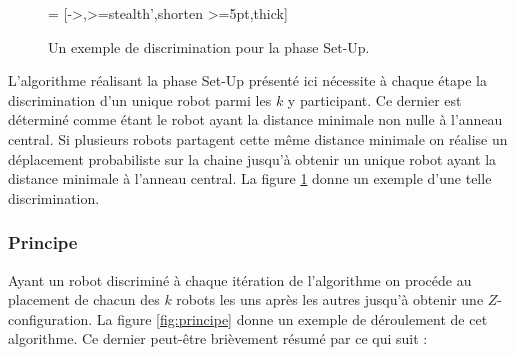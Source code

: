 \documentclass{article}
\begin{document}
        \begin{figure}[h]
          \centering
           = [->,>=stealth',shorten >=5pt,thick]
          \caption{Un exemple de discrimination pour la phase Set-Up.}
          \label{fig:discri}
        \end{figure}

        L'algorithme réalisant la phase Set-Up présenté ici nécessite à chaque
        étape la discrimination d'un unique robot parmi les $k$ y
        participant. Ce dernier est déterminé comme étant le robot ayant la
        distance minimale non nulle à l'anneau central. Si plusieurs robots
        partagent cette même distance minimale on réalise un déplacement
        probabiliste sur la chaine jusqu'à obtenir un unique robot ayant la
        distance minimale à l'anneau central. La figure \ref{fig:discri} donne
        un exemple d'une telle discrimination.

      \subsubsection{Principe}
      
        Ayant un robot discriminé à chaque itération de l'algorithme on procéde
        au placement de chacun des $k$ robots les uns après les autres jusqu'à
        obtenir une $Z$-configuration. La figure \ref{fig:principe} donne un
        exemple de déroulement de cet algorithme. Ce dernier peut-être
        brièvement résumé par ce qui suit :
\end{document}
